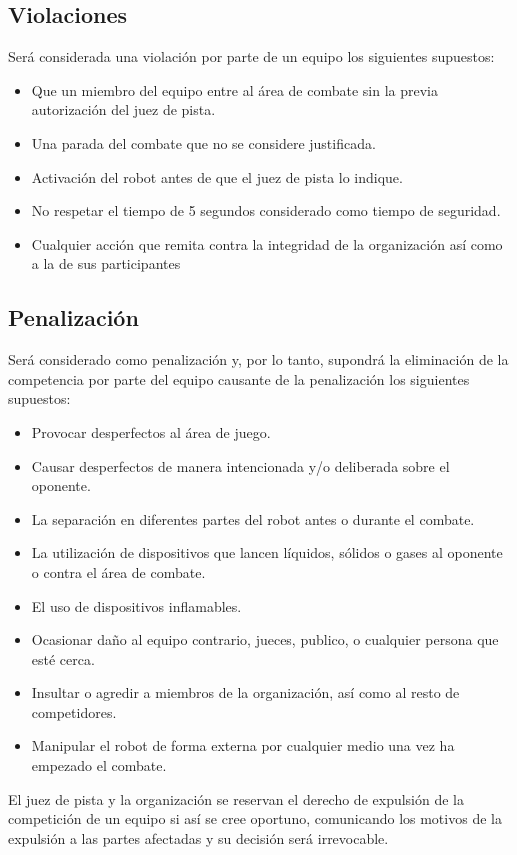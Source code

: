 \documentclass[12pt]{book}
\theoremstyle{definition}
\theoremstyle{remark}
\theoremstyle{plain}
\begin{document}
\subsection{Violaciones}
Será considerada una violación por parte de un equipo los siguientes supuestos: 
\begin{itemize}
 \item Que un miembro del equipo entre al área de combate sin la previa autorización del juez de pista. 
 \item Una parada del combate que no se considere justificada. 
 \item Activación del robot antes de que el juez de pista lo indique. 
 \item No respetar el tiempo de 5 segundos considerado como tiempo de seguridad. 
 \item Cualquier acción que remita contra la integridad de la organización así como a la de sus participantes
\end{itemize}

\subsection{Penalización}

Será considerado como penalización y, por lo tanto, supondrá la eliminación de la competencia por parte del equipo causante de la penalización los siguientes supuestos: 
\begin{itemize}
 \item Provocar desperfectos al área de juego. 
 \item Causar desperfectos de manera intencionada y/o deliberada sobre el oponente.
 \item La separación en diferentes partes del robot antes o durante el combate.
 \item La utilización de dispositivos que lancen líquidos, sólidos o gases al oponente o contra el área de combate. 
 \item El uso de dispositivos inflamables. 
 \item Ocasionar daño al equipo contrario, jueces, publico, o cualquier persona que esté cerca. 
 \item Insultar o agredir a miembros de la organización, así como al resto de competidores. 
 \item Manipular el robot de forma externa por cualquier medio una vez ha empezado el combate. 
\end{itemize}
El juez de pista y la organización se reservan el derecho de expulsión de la competición de un equipo si así 
se cree oportuno, comunicando los motivos de la expulsión a las partes afectadas y su decisión será irrevocable.
\end{document}
